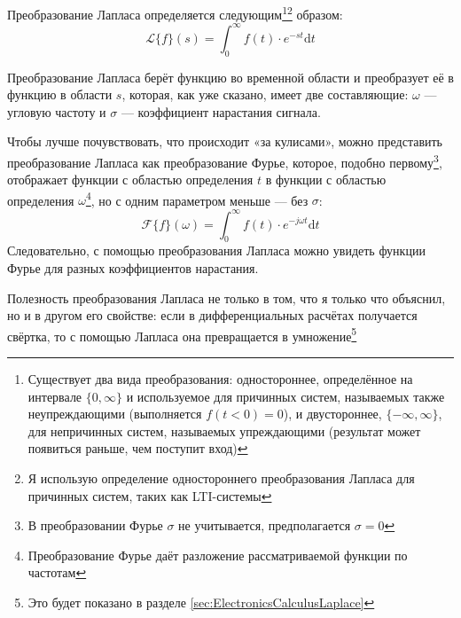 \documentclass[a4paper, 10pt, final]{article} %
\begin{document}
    \begin{samepage}
        \noindent Преобразование Лапласа определяется следующим\footnote{Существует два вида преобразования: одностороннее, определённое на интервале $\{0,\infty\}$ и используемое для причинных систем, называемых также неупреждающими (выполняется $f(t<0)=0$), и двустороннее, $\{-\infty,\infty\}$, для непричинных систем, называемых упреждающими (результат может появиться раньше, чем поступит вход)}\:\footnote{Я использую определение одностороннего преобразования Лапласа для причинных систем, таких как LTI-системы} образом: \nopagebreak
        \[
            \mathcal{L}\{f\}(s) = \int_{0}^{\infty} f(t) \cdot e^{-st} \mathrm{d}t
        \]
    \end{samepage}%
    \noindent Преобразование Лапласа берёт функцию во временной области и преобразует её в функцию в области $s$, которая, как уже сказано, имеет две составляющие: $\omega$ --- угловую частоту и $\sigma$ --- коэффициент нарастания сигнала.
    \begin{samepage}
        Чтобы лучше почувствовать, что происходит «за кулисами», можно представить преобразование Лапласа как преобразование Фурье, которое, подобно первому\footnote{В преобразовании Фурье $\sigma$ не учитывается, предполагается $\sigma = 0$}, отображает функции с областью определения $t$ в функции с областью определения $\omega$\footnote{Преобразование Фурье даёт разложение рассматриваемой функции по частотам}, но с одним параметром меньше --- без $\sigma$:
        \[
            \mathcal{F}\{f\}(\omega) = \int_{0}^{\infty} f(t) \cdot e^{-j\omega t} \mathrm{d}t
        \]
        \noindent Следовательно, с помощью преобразования Лапласа можно увидеть функции Фурье для разных коэффициентов нарастания.
    \end{samepage}%
    
    Полезность преобразования Лапласа не только в том, что я только что объяснил, но и в другом его свойстве: если в дифференциальных расчётах получается свёртка, то с помощью Лапласа она превращается в умножение\footnote{Это будет показано в разделе \ref{sec:ElectronicsCalculusLaplace}}
\end{document}

